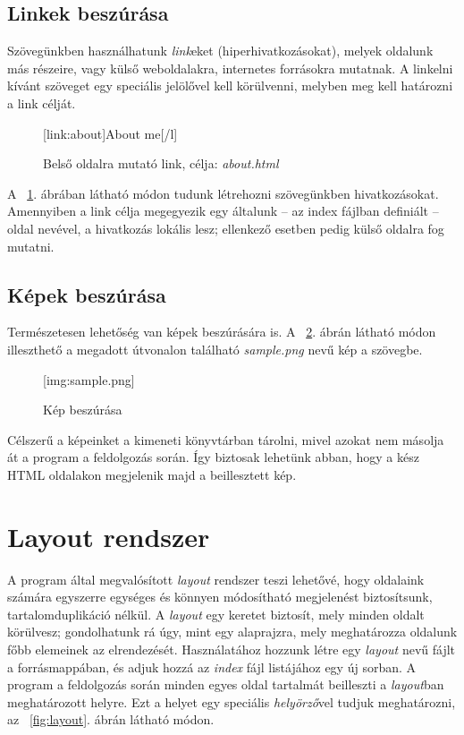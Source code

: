 \documentclass[a4paper,10pt]{article}
\begin{document}
\subsection{Linkek beszúrása}
Szövegünkben használhatunk \emph{link}eket (hiperhivatkozásokat), melyek oldalunk más részeire, vagy külső weboldalakra, internetes forrásokra mutatnak. A linkelni kívánt szöveget egy speciális jelölővel kell körülvenni, melyben meg kell határozni a link célját.

\begin{figure}[h]
	\begin{center}
		[link:about]About me[/l]
		\caption{Belső oldalra mutató link, célja: \emph{about.html}}
		\label{fig:loclink}
	\end{center}
\end{figure}

A ~\ref{fig:loclink}. ábrában látható módon tudunk létrehozni szövegünkben hivatkozásokat. Amennyiben a link célja megegyezik egy általunk -- az index fájlban definiált -- oldal nevével, a hivatkozás lokális lesz; ellenkező esetben pedig külső oldalra fog mutatni.

\subsection{Képek beszúrása}
Természetesen lehetőség van képek beszúrására is. A ~\ref{fig:insimg}. ábrán látható módon illeszthető a megadott útvonalon található \emph{sample.png} nevű kép a szövegbe.

\begin{figure}[h]
	\begin{center}
		[img:sample.png]
		\caption{Kép beszúrása}
		\label{fig:insimg}
	\end{center}
\end{figure}

Célszerű a képeinket a kimeneti könyvtárban tárolni, mivel azokat nem másolja át a program a feldolgozás során. Így biztosak lehetünk abban, hogy a kész HTML oldalakon megjelenik majd a beillesztett kép.

\section{Layout rendszer}
\label{sec:layout}
A program által megvalósított \emph{layout} rendszer teszi lehetővé, hogy oldalaink számára egyszerre egységes és könnyen módosítható megjelenést biztosítsunk, tartalomduplikáció nélkül. A \emph{layout} egy keretet biztosít, mely minden oldalt körülvesz; gondolhatunk rá úgy, mint egy alaprajzra, mely meghatározza oldalunk főbb elemeinek az elrendezését. Használatához hozzunk létre egy \emph{layout} nevű fájlt a forrásmappában, és adjuk hozzá az \emph{index} fájl listájához egy új sorban.
A program a feldolgozás során minden egyes oldal tartalmát beilleszti a \emph{layout}ban meghatározott helyre. Ezt a helyet egy speciális \emph{helyörző}vel tudjuk meghatározni, az ~\ref{fig:layout}. ábrán látható módon.
\end{document}
